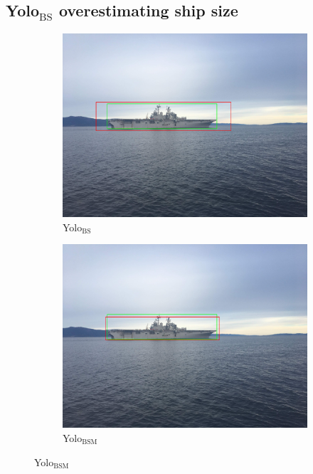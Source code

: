 \subsection{Yolo$_{\text{BS}}$ overestimating ship size}
\label{sec:yolo1_big_box}
\begin{figure}[h!]
\begin{subfigure}{.5\textwidth}
  \centering
  \includegraphics[width=0.75\linewidth]{results/case_tr_moor/yolo12/yolo1/big/IMG_2213.jpg}
  \caption{Yolo$_{\text{BS}}$}
\end{subfigure}%
\begin{subfigure}{.5\textwidth}
  \centering
  \includegraphics[width=.75\linewidth]{results/case_tr_moor/yolo12/yolo2/big/IMG_2213.jpg}
  \caption{Yolo$_{\text{BSM}}$}
\end{subfigure}


\end{figure}
